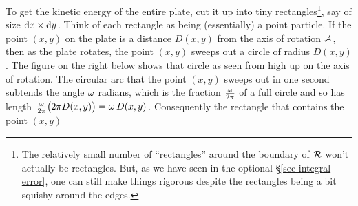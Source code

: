 To get the kinetic energy of the entire plate, cut it up into tiny
rectangles\footnote{The relatively small number of ``rectangles''
around the boundary of $\mathcal{R}$ won't actually be rectangles. But, as we have seen
in the optional \S\ref{sec integral error}, one can still make things 
rigorous despite the rectangles being a bit squishy around the edges.}, 
say of size $\mathrm{d}x\times\mathrm{d}y$. Think of
each rectangle as being (essentially) a point particle. If the  point
$(x,y)$ on the plate is a distance $D(x,y)$ from the axis of rotation
$\mathcal{A}$, then as the plate rotates, the point $(x,y)$ sweeps out a circle of
radius $D(x,y)$. The figure on the right below shows that circle as seen
from high up on the axis of rotation.
The circular arc that the point $(x,y)$ sweeps out in one second
subtends the angle $\omega$ radians, which is the fraction $\frac{\omega}{2\pi}$
of a full circle and so has length 
$\frac{\omega}{2\pi}\big(2\pi D(x,y)\big)=\omega\,D(x,y)$. 
Consequently the rectangle that contains the point $(x,y)$
